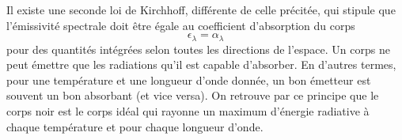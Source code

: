 \sk
Il existe une seconde loi de Kirchhoff, différente de celle précitée, qui stipule que l'émissivité spectrale doit être égale au coefficient d'absorption du corps $$ \epsilon_\lambda = \alpha_\lambda $$ pour des quantités intégrées selon toutes les directions de l'espace. Un corps ne peut émettre que les radiations qu'il est capable d'absorber. En d'autres termes, pour une température et une longueur d'onde donnée, un bon émetteur est souvent un bon absorbant (et vice versa). On retrouve par ce principe que le corps noir est le corps idéal qui rayonne un maximum d'énergie radiative à chaque température et pour chaque longueur d'onde. 

